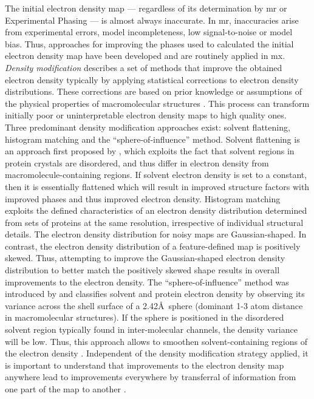 The initial electron density map --- regardless of its determination by \gls{mr} or Experimental Phasing --- is almost always inaccurate. In \gls{mr}, inaccuracies arise from experimental errors, model incompleteness, low signal-to-noise or model bias. Thus, approaches for improving the phases used to calculated the initial electron density map have been developed and are routinely applied in \gls{mx}. \textit{Density modification} describes a set of methods that improve the obtained electron density typically by applying statistical corrections to electron density distributions. These corrections are based on prior knowledge or assumptions of the physical properties of macromolecular structures \cite{Rupp2010-nc}. This process can transform initially poor or uninterpretable electron density maps to high quality ones. Three predominant density modification approaches exist: solvent flattening, histogram matching and the ``sphere-of-influence'' method. Solvent flattening is an approach first proposed by \textcite{Wang1985-zu}, which exploits the fact that solvent regions in protein crystals are disordered, and thus differ in electron density from macromolecule-containing regions. If solvent electron density is set to a constant, then it is essentially flattened which will result in improved structure factors with improved phases and thus improved electron density. Histogram matching \cite{Lunin1988-lx} exploits the defined characteristics of an electron density distribution determined from sets of proteins at the same resolution, irrespective of individual structural details. The electron density distribution for noisy maps are Gaussian-shaped. In contrast, the electron density distribution of a feature-defined map is positively skewed. Thus, attempting to improve the Gaussian-shaped electron density distribution to better match the positively skewed shape results in overall improvements to the electron density. The ``sphere-of-influence'' method was introduced by \textcite{Sheldrick2002-tx} and classifies solvent and protein electron density by observing its variance across the shell surface of a 2.42\AA\ sphere (dominant 1-3 atom distance in macromolecular structures). If the sphere is positioned in the disordered solvent region typically found in inter-molecular channels, the density variance will be low. Thus, this approach allows to smoothen solvent-containing regions of the electron density \cite{Sheldrick2002-tx}. Independent of the density modification strategy applied, it is important to understand that improvements to the electron density map anywhere lead to improvements everywhere by transferral of information from one part of the map to another \cite{Terwilliger2000-sz}.

